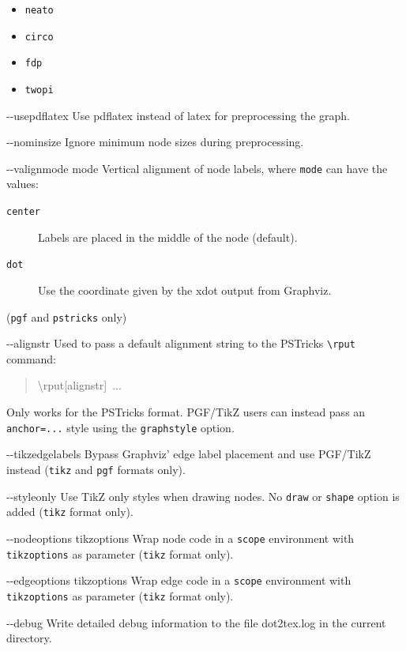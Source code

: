 \documentclass[10pt,a4paper,english]{article}
\newcommand{\optionlistlabel}[1]{\bf #1 \hfill}
\newenvironment{optionlist}[1]
{\begin{list}{}
  {\setlength{\labelwidth}{#1}
   \setlength{\rightmargin}{1cm}
   \setlength{\leftmargin}{\rightmargin}
   \addtolength{\leftmargin}{\labelwidth}
   \addtolength{\leftmargin}{\labelsep}
   \renewcommand{\makelabel}{\optionlistlabel}}
}{\end{list}}
\begin{document}
\begin{optionlist}{3cm}
\begin{itemize}
\item {} 
\texttt{neato}

\item {} 
\texttt{circo}

\item {} 
\texttt{fdp}

\item {} 
\texttt{twopi}

\end{itemize}
\item [-{}-usepdflatex]  
Use pdflatex instead of latex for preprocessing the graph.
\item [-{}-nominsize]  
Ignore minimum node sizes during preprocessing.
\item [-{}-valignmode mode]  
Vertical alignment of node labels, where \texttt{mode} can have the values:
\begin{description}
\item[{\texttt{center}}] \leavevmode 
Labels are placed in the middle of the node (default).

\item[{\texttt{dot}}] \leavevmode 
Use the coordinate given by the xdot output from Graphviz.

\end{description}

(\texttt{pgf} and \texttt{pstricks} only)
\item [-{}-alignstr]  
Used to pass a default alignment string to the PSTricks \texttt{{\textbackslash}rput} command:
\begin{quote}{\ttfamily \raggedright \noindent
{\textbackslash}rput{[}alignstr{]}~...
}\end{quote}

Only works for the PSTricks format. PGF/TikZ users can instead pass an \texttt{anchor=...} style using the \texttt{graphstyle} option.
\item [-{}-tikzedgelabels]  
Bypass Graphviz' edge label placement and use PGF/TikZ instead (\texttt{tikz} and \texttt{pgf} formats only).
\item [-{}-styleonly]  
Use TikZ only styles when drawing nodes. No \texttt{draw} or \texttt{shape} option is added (\texttt{tikz} format only).
\item [-{}-nodeoptions tikzoptions]  
Wrap node code in a \texttt{scope} environment with \texttt{tikzoptions} as parameter (\texttt{tikz} format only).
\item [-{}-edgeoptions tikzoptions]  
Wrap edge code in a \texttt{scope} environment with \texttt{tikzoptions} as parameter (\texttt{tikz} format only).
\item [-{}-debug]  
Write detailed debug information to the file dot2tex.log in the current directory.
\end{optionlist}
\end{document}
